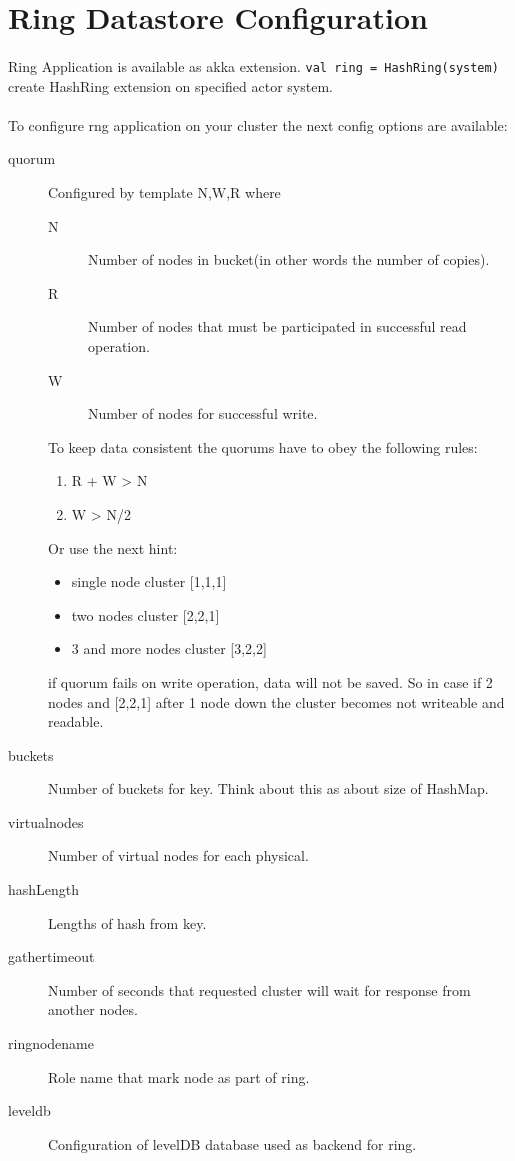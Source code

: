 \section*{Ring Datastore Configuration}
\paragraph{}
Ring Application is available as akka extension.
\lstinline|val ring = HashRing(system)| \- create HashRing extension on specified actor system.

\paragraph{}
To configure rng application on your cluster the next config options are available:

\begin{description}
\item[quorum] Configured by template N,W,R where

\begin{description}
\item[N] Number of nodes in bucket(in other words the number of copies).
\item[R] Number of nodes that must  be participated in successful read operation.
\item[W] Number of nodes for successful write.
\end{description}

To keep data consistent the quorums have to obey the following rules:
\begin{enumerate}
\item R + W > N
\item W > N/2
\end{enumerate}

Or use the next hint:
\begin{itemize}
\item single node cluster [1,1,1]
\item two nodes cluster [2,2,1]
\item 3 and more nodes cluster [3,2,2]
\end{itemize}

if quorum fails on write operation, data will not be saved.
So in case if 2 nodes and [2,2,1] after 1 node down the cluster becomes not writeable and readable.
\item[buckets] Number of buckets for key. Think about this as about size of HashMap.
\item[virtual\-nodes] Number of virtual nodes for each physical.
\item[hashLength] Lengths of hash from key.
\item[gather\-timeout] Number of seconds that requested cluster will wait for response from another nodes.
\item[ring\-node\-name] Role name that mark node as part of ring.
\item[leveldb] Configuration of levelDB database used as backend for ring.
\end{description}


